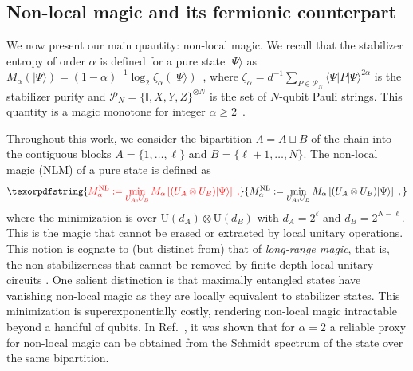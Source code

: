 \documentclass[prx,twocolumn,superscriptaddress,aps,10pt, frontmatterverbose, reprint,footinbib,longbibliography=true]{revtex4-2}
\newcommand{\RENYI}{\alpha}
\providecommand{\DIFaddtex}[1]{{\protect\color{red}#1}} %
\providecommand{\DIFaddbegin}{\protect\color{red}} %
\providecommand{\DIFaddend}{\protect\color{black}} %
\providecommand{\DIFaddtex}[1]{\texorpdfstring{\DIFaddtex{#1}}{#1}} %
\providecommand{\DIFadd}[1]{\texorpdfstring{\DIFaddtex{#1}}{#1}} %
\newcommand{\DIFaddincludegraphics}[2][]{{\color{blue}\fbox{\DIFOincludegraphics[#1]{#2}}}} %
\DeclareRobustCommand{\DIFaddbegin}{\DIFOaddbegin \let\includegraphics\DIFaddincludegraphics} %
\DeclareRobustCommand{\DIFaddend}{\DIFOaddend \let\includegraphics\DIFOincludegraphics} %
\begin{document}
\subsection{Non-local magic and its fermionic counterpart}
We now present our main quantity: non-local magic.
We recall that the stabilizer entropy of order $\RENYI$ is defined for a pure state $|\Psi\rangle$ as $M_\RENYI(|\Psi\rangle)=(1-\RENYI)^{-1}\log_2 \zeta_\RENYI(|\Psi\rangle)$~\cite{Leone2022SRE}, where $\zeta_\RENYI= d^{-1}\sum_{P\in \mathcal{P}_N} \langle \Psi|P|\Psi\rangle^{2\RENYI}$ is the stabilizer purity and $\mathcal{P}_N=\{ \mathbb{I},X,Y,Z\}^{\otimes N}$  is the set of $N$-qubit Pauli strings. This quantity is a magic monotone for integer $\RENYI\ge 2$~\cite{piro,leone2024stabilizer}.

\DIFaddbegin \DIFadd{Throughout this work, we consider the bipartition $\Lambda = A\sqcup B$ of the chain into the contiguous blocks $A=\{1,\dots,\ell\}$ and $B=\{\ell+1,\dots,N\}$. }\DIFaddend The non-local magic (NLM) \DIFaddbegin \DIFadd{of }\DIFaddend a pure state \DIFaddbegin \DIFadd{is defined as 
}\begin{equation}
    \DIFadd{M_\RENYI^\textup{NL}:= \min_{U_A , U_B} M_\RENYI\left[(U_A\otimes U_B)|\Psi\rangle\right]\;,\label{eq:defNLmagic}
}\end{equation}\DIFaddend 
where the minimization is over $\mathrm{U}(d_A)\otimes \mathrm{U}(d_B)$ with $d_A=2^{\ell}$ and $d_B = 2^{N-\ell}$. This is the magic that cannot be erased or extracted by local unitary operations. This notion is cognate to (but distinct from) that of {\em long-range magic}, that is, the non-stabilizerness that cannot be removed by finite-depth local unitary circuits \cite{Korbany2025}. One salient distinction is that maximally entangled states have vanishing non-local magic as they are locally equivalent to stabilizer states.
This minimization is superexponentially costly, rendering non-local magic intractable beyond a handful of qubits.
In Ref.~\cite{Cao_2025}, it was shown that for $\RENYI = 2$ a reliable proxy for non-local magic can be obtained from the Schmidt spectrum of the state over the same bipartition.
\end{document}
